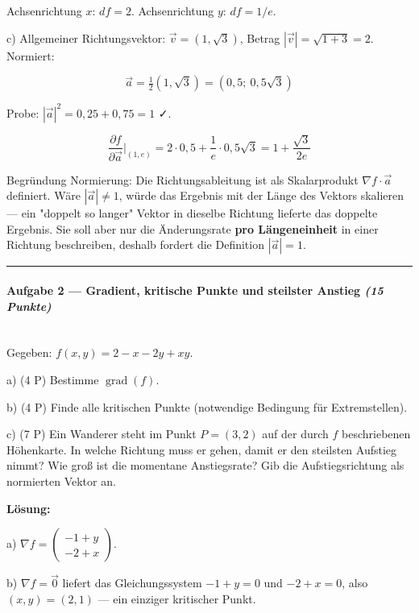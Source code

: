 \documentclass[11pt, a4paper]{article}
\begin{document}
Achsenrichtung $x$: $df = 2$. Achsenrichtung $y$: $df = 1/e$.


c) Allgemeiner Richtungsvektor: $\vec{v} = (1, \sqrt{3})$, Betrag $|\vec{v}| = \sqrt{1+3} = 2$. Normiert:

\[
\vec{a} = \tfrac{1}{2}(1, \sqrt{3}) = (0{,}5;\ 0{,}5\sqrt{3})
\]

Probe: $|\vec{a}|^2 = 0{,}25 + 0{,}75 = 1$ ✓.

\[
\frac{\partial f}{\partial \vec{a}}\bigg|_{(1,e)} = 2\cdot 0{,}5 + \frac{1}{e}\cdot 0{,}5\sqrt{3} = 1 + \frac{\sqrt{3}}{2e}
\]

Begründung Normierung: Die Richtungsableitung ist als Skalarprodukt $\nabla f \cdot \vec{a}$ definiert. Wäre $|\vec{a}| \neq 1$, würde das Ergebnis mit der Länge des Vektors skalieren — ein "doppelt so langer" Vektor in dieselbe Richtung lieferte das doppelte Ergebnis. Sie soll aber nur die Änderungsrate \textbf{pro Längeneinheit} in einer Richtung beschreiben, deshalb fordert die Definition $|\vec{a}|=1$.



\noindent\textcolor{rulegray}{\rule{\linewidth}{0.4pt}}


\paragraph{Aufgabe 2 — Gradient, kritische Punkte und steilster Anstieg \textit{(15 Punkte)}}\mbox{}\\[2pt]

Gegeben: $f(x,y) = 2 - x - 2y + xy$.


a) (4 P) Bestimme $\operatorname{grad}(f)$.


b) (4 P) Finde alle kritischen Punkte (notwendige Bedingung für Extremstellen).


c) (7 P) Ein Wanderer steht im Punkt $P=(3,2)$ auf der durch $f$ beschriebenen Höhenkarte. In welche Richtung muss er gehen, damit er den steilsten Aufstieg nimmt? Wie groß ist die momentane Anstiegsrate? Gib die Aufstiegsrichtung als normierten Vektor an.


\textbf{Lösung:}


a) $\nabla f = \begin{pmatrix} -1+y \\ -2+x \end{pmatrix}$.


b) $\nabla f = \vec{0}$ liefert das Gleichungssystem $-1+y=0$ und $-2+x=0$, also $\boxed{(x,y) = (2,1)}$ — ein einziger kritischer Punkt.
\end{document}
